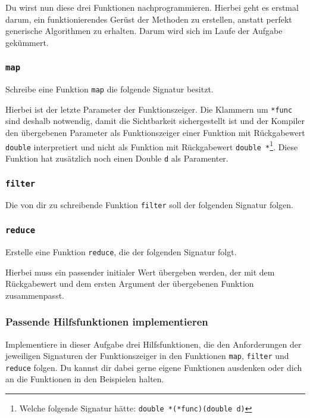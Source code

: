 Du wirst nun diese drei Funktionen nachprogrammieren.
Hierbei geht es erstmal darum, ein funktionierendes Gerüst der Methoden zu erstellen, anstatt perfekt generische Algorithmen zu erhalten.
Darum wird sich im Laufe der Aufgabe gekümmert.

\subsubsection{\lstinline{map}}

Schreibe eine Funktion \lstinline{map} die folgende Signatur besitzt.


Hierbei ist der letzte Parameter der Funktionszeiger.
Die Klammern um \lstinline{*func} sind deshalb notwendig, damit die Sichtbarkeit sichergestellt ist und der Kompiler den übergebenen Parameter als Funktionszeiger einer Funktion mit Rückgabewert \lstinline{double} interpretiert und nicht als Funktion mit Rückgabewert \lstinline{double *}\footnote{Welche folgende Signatur hätte: \lstinline{double *(*func)(double d)}}.
Diese Funktion hat zusätzlich noch einen Double \lstinline{d} als Paramenter.

\subsubsection{\lstinline{filter}}

Die von dir zu schreibende Funktion \lstinline{filter} soll der folgenden Signatur folgen.


\subsubsection{\lstinline{reduce}}

Erstelle eine Funktion \lstinline{reduce}, die der folgenden Signatur folgt.


Hierbei muss ein passender initialer Wert übergeben werden, der mit dem Rückgabewert und dem ersten Argument der übergebenen Funktion zusammenpasst.

\subsubsection{Passende Hilfsfunktionen implementieren}
Implementiere in dieser Aufgabe drei Hilfsfunktionen, die den Anforderungen der jeweiligen Signaturen der Funktionszeiger in den Funktionen \lstinline{map}, \lstinline{filter} und \lstinline{reduce} folgen.
Du kannst dir dabei gerne eigene Funktionen ausdenken oder dich an die Funktionen in den Beispielen halten. 

